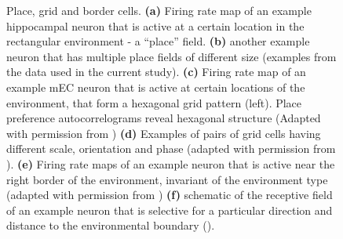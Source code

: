 \begin{figure}
\captionsetup{format=plain}
\caption[Place and grid cells]{
Place, grid and border cells. \textbf{(a)} Firing rate map of an example hippocampal neuron that is active at a certain location in the rectangular environment - a “place” field. \textbf{(b)} another example neuron that has multiple place fields of different size (examples from the data used in the current study). \textbf{(c)} Firing rate map of an example mEC neuron that is active at certain locations of the environment, that form a hexagonal grid pattern (left). Place preference autocorrelograms reveal hexagonal structure (Adapted with permission from \cite{Moser2015}) \textbf{(d)} Examples of pairs of grid cells having different scale, orientation and phase (adapted with permission from \cite{Moser2014}). \textbf{(e)} Firing rate maps of an example neuron that is active near the right border of the environment, invariant of the environment type (adapted with permission from \cite{Solstad2008}) \textbf{(f)} schematic of the receptive field of an example neuron that is selective for a particular direction and distance to the environmental boundary (\cite{Lever2009}).
}
\label{fig:F1_place_cells}
\end{figure}


